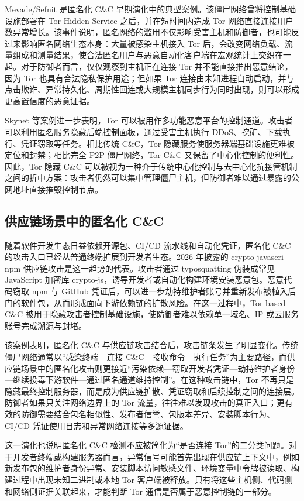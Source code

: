 Mevade/Sefnit 是匿名化 C\&C 早期演化中的典型案例。该僵尸网络曾将控制基础设施部署在 Tor Hidden Service 之后，并在短时间内造成 Tor 网络直接连接用户数异常增长。该事件说明，匿名网络的滥用不仅影响受害主机和防御者，也可能反过来影响匿名网络生态本身：大量被感染主机接入 Tor 后，会改变网络负载、流量组成和测量结果，使合法匿名用户与恶意自动化客户端在宏观统计上交织在一起。对于防御者而言，仅仅观察到主机正在连接 Tor 并不能直接推出恶意结论，因为 Tor 也具有合法隐私保护用途；但如果 Tor 连接由未知进程自动启动，并与点击欺诈、异常持久化、周期性回连或大规模主机同步行为同时出现，则可以形成更高置信度的恶意证据。

Skynet 等案例进一步表明，Tor 可以被用作多功能恶意平台的控制通道。攻击者可以利用匿名服务隐藏后端控制面板，通过受害主机执行 DDoS、挖矿、下载执行、凭证窃取等任务。相比传统 C\&C，Tor 隐藏服务使服务器端基础设施更难被定位和封禁；相比完全 P2P 僵尸网络，Tor C\&C 又保留了中心化控制的便利性。因此，Tor 隐藏 C\&C 可以被视为一种介于传统中心化控制与去中心化抗接管机制之间的折中方案：攻击者仍然可以集中管理僵尸主机，但防御者难以通过暴露的公网地址直接摧毁控制节点。

\subsection{供应链场景中的匿名化 C\&C}

随着软件开发生态日益依赖开源包、CI/CD 流水线和自动化凭证，匿名化 C\&C 的攻击入口已经从普通终端扩展到开发者生态。2026 年披露的 crypto-javascri npm 供应链攻击是这一趋势的代表。攻击者通过 typosquatting 伪装成常见 JavaScript 加密库 crypto-js，诱导开发者或自动化构建环境安装恶意包。恶意代码窃取 npm 与 GitHub 凭证后，可以进一步劫持维护者账号并重新发布被植入后门的软件包，从而形成面向下游依赖链的扩散风险。在这一过程中，Tor-based C\&C 被用于隐藏攻击者控制基础设施，使防御者难以依赖单一域名、IP 或云服务账号完成溯源与封堵。

该案例表明，匿名化 C\&C 与供应链攻击结合后，攻击链条发生了明显变化。传统僵尸网络通常以“感染终端—连接 C\&C—接收命令—执行任务”为主要路径，而供应链场景中的匿名化攻击则更接近“污染依赖—窃取开发者凭证—劫持维护者身份—继续投毒下游软件—通过匿名通道维持控制”。在这种攻击链中，Tor 不再只是隐藏最终控制服务器，而是成为供应链扩散、凭证窃取和后续控制之间的连接层。防御者如果只关注网络边界上的 Tor 流量，往往难以发现攻击的真正入口；更有效的防御需要结合包名相似性、发布者信誉、包版本差异、安装脚本行为、CI/CD 凭证使用日志和异常网络连接等多源证据。

这一演化也说明匿名化 C\&C 检测不应被简化为“是否连接 Tor”的二分类问题。对于开发者终端或构建服务器而言，异常信号可能首先出现在供应链上下文中，例如新发布包的维护者身份异常、安装脚本访问敏感文件、环境变量中令牌被读取、构建过程中出现未知二进制或本地 Tor 客户端被释放。只有将这些主机侧、代码侧和网络侧证据关联起来，才能判断 Tor 通信是否属于恶意控制链的一部分。

